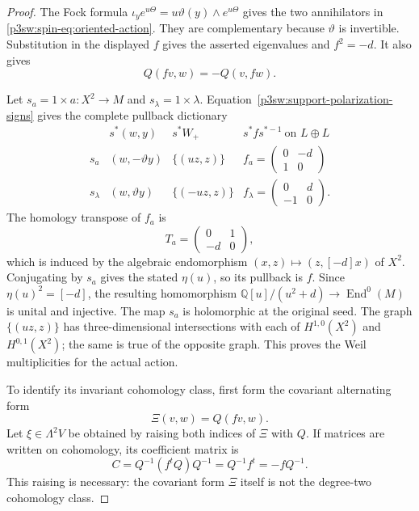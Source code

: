 \documentclass[11pt]{article}
\newcommand{\Q}{\mathbb Q}
\numberwithin{equation}{section}
\begin{document}
\begin{proof}
The Fock formula
\(\iota_y e^{u\Theta}=u\vartheta(y)\wedge e^{u\Theta}\)
gives the two annihilators in
\eqref{p3sw:spin-eq:oriented-action}.  They are complementary because
\(\vartheta\) is invertible.  Substitution in the displayed \(f\)
gives the asserted eigenvalues and \(f^2=-d\).  It also gives
\[
 Q(fv,w)=-Q(v,fw).
\]

Let \(s_a=1\times a:X^2\to M\) and
\(s_\lambda=1\times\lambda\).  Equation~\eqref{p3sw:support-polarization-signs}
gives the complete pullback dictionary
\begin{equation}
\label{p3sw:spin-eq:action-matrices}
 \begin{array}{c|c|c|c}
 &s^*(w,y)&s^*W_+&s^*fs^{*-1}\ \text{on }L\oplus L\\ \hline
 s_a&(w,-\vartheta y)&\{(uz,z)\}&
       f_a=\begin{pmatrix}0&-d\\1&0\end{pmatrix}\\[2mm]
 s_\lambda&(w,\vartheta y)&\{(-uz,z)\}&
       f_\lambda=\begin{pmatrix}0&d\\-1&0\end{pmatrix}.
 \end{array}
\end{equation}
The homology transpose of \(f_a\) is
\[
 T_a=\begin{pmatrix}0&1\\-d&0\end{pmatrix},
\]
which is induced by the algebraic endomorphism
\((x,z)\mapsto(z,[-d]x)\) of \(X^2\).  Conjugating by \(s_a\)
gives the stated \(\eta(u)\), so its pullback is \(f\).
Since \(\eta(u)^2=[-d]\), the resulting homomorphism
\(\Q[u]/(u^2+d)\to\operatorname{End}^0(M)\) is unital and injective.
The map \(s_a\) is holomorphic at the original seed.  The graph
\(\{(uz,z)\}\) has three-dimensional intersections with each of
\(H^{1,0}(X^2)\) and \(H^{0,1}(X^2)\); the same is true of the
opposite graph.  This proves the Weil multiplicities for the actual
action.

To identify its invariant cohomology class, first form the covariant
alternating form
\[
 \Xi(v,w)=Q(fv,w).
\]
Let \(\xi\in\Lambda^2 V\) be obtained by raising both indices of
\(\Xi\) with \(Q\).  If matrices are written on cohomology, its
coefficient matrix is
\begin{equation}
\label{p3sw:spin-eq:raised}
 C=Q^{-1}(f^tQ)Q^{-1}=Q^{-1}f^t=-fQ^{-1}.
\end{equation}
This raising is necessary: the covariant form \(\Xi\) itself is not
the degree-two cohomology class.


\end{proof}
\end{document}
